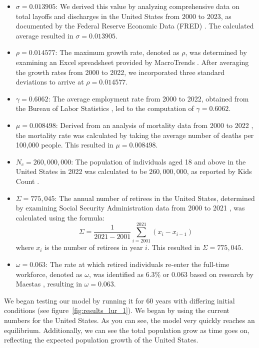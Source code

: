 \documentclass[11pt]{amsart}
\begin{document}
\begin{itemize}
    \item $\sigma = 0.013905$: We derived this value by analyzing comprehensive data on total layoffs and discharges in the United States from 2000 to 2023, as documented by the Federal Reserve Economic Data (FRED) \cite{FRED}. The calculated average resulted in $\sigma = 0.013905$.
    \item $\rho = 0.014577$: The maximum growth rate, denoted as $\rho$, was determined by examining an Excel spreadsheet provided by MacroTrends \cite{MacroTrends}. After averaging the growth rates from 2000 to 2022, we incorporated three standard deviations to arrive at $\rho = 0.014577$.
    \item $\gamma = 0.6062$: The average employment rate from 2000 to 2022, obtained from the Bureau of Labor Statistics \cite{BLS}, led to the computation of $\gamma = 0.6062$.
    \item $\mu = 0.008498$: Derived from an analysis of mortality data from 2000 to 2022 \cite{usafacts}, the mortality rate was calculated by taking the average number of deaths per 100,000 people. This resulted in $\mu = 0.008498$.
    \item $N_c = 260,000,000$: The population of individuals aged 18 and above in the United States in 2022 was calculated to be $260,000,000$, as reported by Kids Count \cite{kidscount}.
    \item $\Sigma = 775,045$: The annual number of retirees in the United States, determined by examining Social Security Administration data from 2000 to 2021 \cite{ssa}, was calculated using the formula:
    \[
        \Sigma = \frac{1}{2021 - 2001}\sum_{i=2001}^{2021}(x_i - x_{i-1})
    \]
    where $x_i$ is the number of retirees in year $i$. This resulted in $\Sigma = 775,045$.
    \item $\omega = 0.063$: The rate at which retired individuals re-enter the full-time workforce, denoted as $\omega$, was identified as 6.3\% or $0.063$ based on research by Maestas \cite{maestas}, resulting in $\omega = 0.063$.
\end{itemize}
We began testing our model by running it for 60 years with differing initial conditions (see figure~\ref{fig:results_lur_1}). We began by using the current numbers for the United States. As you can see,
the model very quickly reaches an equilibrium. Additionally, we can see the total population grow as time goes on, reflecting the expected population growth of the United States.
\end{document}
